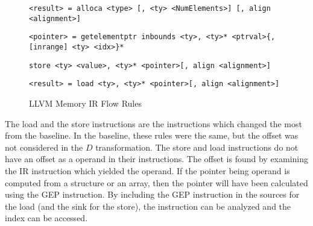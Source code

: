 \begin{figure}[h!]
  \hrulefill
  \begin{lstlisting}[style=nolinenumberstyle]
<result> = alloca <type> [, <ty> <NumElements>] [, align <alignment>]    
  \end{lstlisting}


  \begin{lstlisting}[style=nolinenumberstyle]
<pointer> = getelementptr inbounds <ty>, <ty>* <ptrval>{, [inrange] <ty> <idx>}*
  \end{lstlisting}


  \begin{lstlisting}[style=nolinenumberstyle]
store <ty> <value>, <ty>* <pointer>[, align <alignment>]
  \end{lstlisting}


  \begin{lstlisting}[style=nolinenumberstyle]
<result> = load <ty>, <ty>* <pointer>[, align <alignment>]
  \end{lstlisting}

  \hrulefill
  \caption{LLVM Memory IR Flow Rules}
  \label{fig:llvm-mem-ir}
\end{figure}

The load and the store instructions are the instructions which changed the most
from the baseline. In the baseline, these rules were the same, but the offset
was not considered in the $D$ transformation. The store and load instructions do
not have an offset as a operand in their instructions. The offset is found  by
examining the IR instruction which yielded the operand. If the pointer being
operand is computed from a structure or an array, then the pointer will have
been calculated using the GEP instruction. By including the GEP instruction in
the sources for the load (and the sink for the store), the instruction can be
analyzed and the index can be accessed. 


